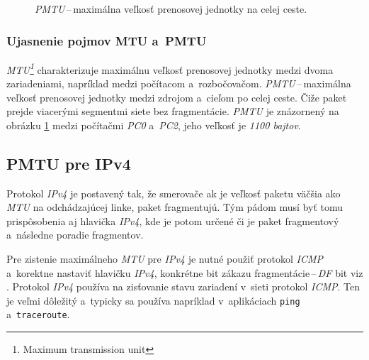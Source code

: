 \documentclass[12pt,a4paper,titlepage]{article}
\begin{document}
        \begin{figure}[htb!]
            \begin{center}
                \caption{\emph{PMTU}\,--\,maximálna veľkosť prenosovej jednotky na celej ceste.} 
                \label{pmtu}
            \end{center}
        \end{figure}

    \subsubsection{Ujasnenie pojmov MTU a~PMTU} 
        \emph{MTU\footnote{Maximum transmission unit}} charakterizuje maximálnu veľkosť prenosovej jednotky medzi
        dvoma zariadeniami, napríklad medzi počítacom a~rozbočovačom.
        \emph{PMTU}\,--\,maximálna veľkosť
        prenosovej jednotky medzi zdrojom a~cieľom po celej ceste. Čiže paket prejde
        viacerými segmentmi siete bez fragmentácie. \emph{PMTU} je znázornený na obrázku
        \ref{pmtu} medzi počítačmi \emph{PC0} a~\emph{PC2}, jeho veľkosť je \emph{1100 bajtov}.

    \subsection{PMTU pre IPv4}
        Protokol \emph{IPv4} je postavený tak, že smerovače
        ak je veľkosť paketu väčšia ako \emph{MTU} na odchádzajúcej linke,
        paket fragmentujú. Tým pádom musí byť tomu prispôsobenia aj hlavička
        \emph{IPv4}, kde je potom určené či je paket fragmentový a~následne poradie fragmentov.

        Pre zistenie maximálneho \emph{MTU} pre \emph{IPv4} je nutné použiť protokol \emph{ICMP}
a~korektne nastaviť hlavičku \emph{IPv4}, konkrétne bit zákazu fragmentácie\,--\,\emph{DF}
        bit viz \cite{rfc_pmtu}.
        Protokol \emph{IPv4} používa na zisťovanie stavu zariadení v~sieti protokol \emph{ICMP}.
        Ten je veľmi dôležitý a~typicky sa používa napríklad v~aplikáciach
        \texttt{ping} a~\texttt{traceroute}.
    
\end{document}
